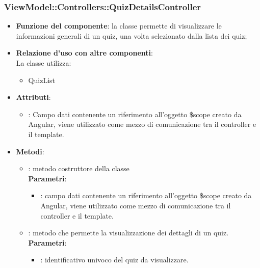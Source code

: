 \subsubsection{ViewModel::Controllers::QuizDetailsController}
\begin{itemize}
\item\textbf{Funzione del componente}: la classe permette di visualizzare le informazioni generali di un quiz, una volta selezionato dalla lista dei quiz;
	\item\textbf{Relazione d'uso con altre componenti}: \\
La classe utilizza:
	\begin{itemize}
		\item QuizList
	\end{itemize}
\item\textbf{Attributi}:
	\begin{itemize}
		\item{}: Campo dati contenente un riferimento all'oggetto \$scope creato da Angular, viene utilizzato come mezzo di comunicazione tra il controller e il template.\\
	\end{itemize}
\item\textbf{Metodi}:
	\begin{itemize}
		\item{}: metodo costruttore della classe\\
		\textbf{Parametri}:
			\begin{itemize}
				\item{}: campo dati contenente un riferimento all’oggetto \$scope creato da Angular, viene utilizzato come mezzo di comunicazione tra il controller e il template.\\
			\end{itemize}
		\item{}: metodo che permette la visualizzazione dei dettagli di un quiz.\\
		\textbf{Parametri}:
			\begin{itemize}
				\item{}: identificativo univoco del quiz da visualizzare.\\
			\end{itemize}
	\end{itemize}
\end{itemize}

